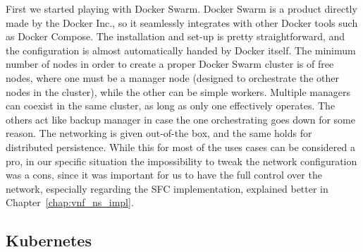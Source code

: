 First we started playing with Docker Swarm. Docker Swarm is a product directly
made by the Docker Inc., so it seamlessly integrates with other Docker tools
such as Docker Compose. The installation and set-up is pretty straightforward,
and the configuration is almost automatically handed by Docker itself. The
minimum number of nodes in order to create a proper Docker Swarm cluster is of
free nodes, where one must be a manager node (designed to orchestrate the other
nodes in the cluster), while the other can be simple workers. Multiple managers
can coexist in the same cluster, as long as only one effectively operates. The
others act like backup manager in case the one orchestrating goes down for some
reason. The networking is given out-of-the box, and the same holds for
distributed persistence. While this for most of the uses cases can be considered
a pro, in our specific situation the impossibility to tweak the network
configuration was a cons, since it was important for us to have the full control
over the network, especially regarding the SFC implementation, explained better
in Chapter~\ref{chap:vnf_ns_impl}.

\subsection{Kubernetes}

